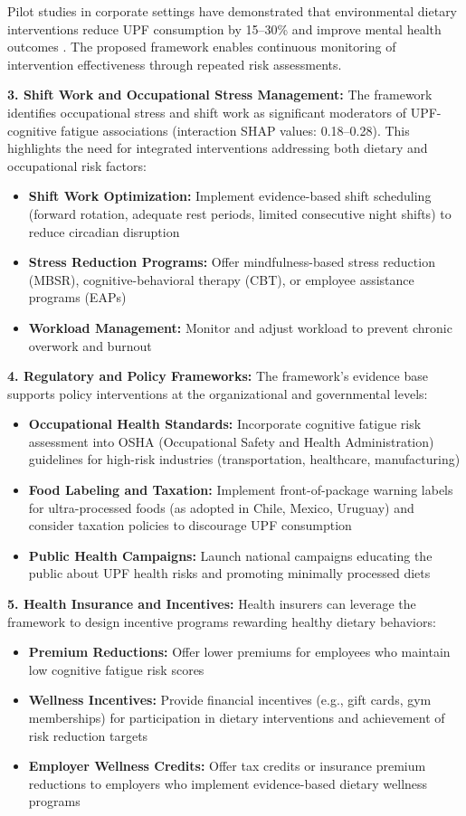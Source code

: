 \documentclass[journal,twoside,10pt]{IEEEtran}
\begin{document}
Pilot studies in corporate settings have demonstrated that environmental dietary interventions reduce UPF consumption by 15--30\% and improve mental health outcomes \cite{ref19}. The proposed framework enables continuous monitoring of intervention effectiveness through repeated risk assessments.

\textbf{3. Shift Work and Occupational Stress Management:}
The framework identifies occupational stress and shift work as significant moderators of UPF-cognitive fatigue associations (interaction SHAP values: 0.18--0.28). This highlights the need for integrated interventions addressing both dietary and occupational risk factors:
\begin{itemize}
\item \textbf{Shift Work Optimization:} Implement evidence-based shift scheduling (forward rotation, adequate rest periods, limited consecutive night shifts) to reduce circadian disruption
\item \textbf{Stress Reduction Programs:} Offer mindfulness-based stress reduction (MBSR), cognitive-behavioral therapy (CBT), or employee assistance programs (EAPs)
\item \textbf{Workload Management:} Monitor and adjust workload to prevent chronic overwork and burnout
\end{itemize}

\textbf{4. Regulatory and Policy Frameworks:}
The framework's evidence base supports policy interventions at the organizational and governmental levels:
\begin{itemize}
\item \textbf{Occupational Health Standards:} Incorporate cognitive fatigue risk assessment into OSHA (Occupational Safety and Health Administration) guidelines for high-risk industries (transportation, healthcare, manufacturing)
\item \textbf{Food Labeling and Taxation:} Implement front-of-package warning labels for ultra-processed foods (as adopted in Chile, Mexico, Uruguay) and consider taxation policies to discourage UPF consumption
\item \textbf{Public Health Campaigns:} Launch national campaigns educating the public about UPF health risks and promoting minimally processed diets
\end{itemize}

\textbf{5. Health Insurance and Incentives:}
Health insurers can leverage the framework to design incentive programs rewarding healthy dietary behaviors:
\begin{itemize}
\item \textbf{Premium Reductions:} Offer lower premiums for employees who maintain low cognitive fatigue risk scores
\item \textbf{Wellness Incentives:} Provide financial incentives (e.g., gift cards, gym memberships) for participation in dietary interventions and achievement of risk reduction targets
\item \textbf{Employer Wellness Credits:} Offer tax credits or insurance premium reductions to employers who implement evidence-based dietary wellness programs
\end{itemize}
\end{document}
